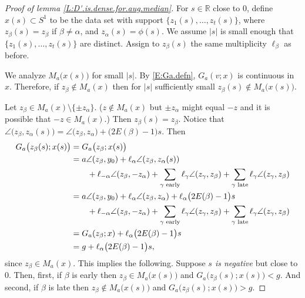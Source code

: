 \documentclass[10pt,a4paper]{amsart}
\newcommand{\RR}{\mathbb{R}}
\begin{document}
\begin{proof}[Proof of lemma \ref{L:D'.is.dense.for.aug.median}]
For $s \in \RR$ close to 0, define $x(s) \subset S^{1}$ to be the data set with support 
$\{ z_{1}(s), \ldots, z_{t}(s) \}$, where $z_{\beta}(s) = z_{\beta}$
if $\beta \neq \alpha$, and $z_{\alpha}(s) = \phi(s)$. We assume $|s|$ is small enough that 
$\{ z_{1}(s), \ldots, z_{t}(s) \}$ are distinct. Assign to $z_{\beta}(s)$ the same multiplicity 
$\ell_{\beta}$ as before. 

We analyze $M_{a} \bigl( x(s) \bigr)$ for small $|s|$. 
By \eqref{E:Ga.defn}, $G_{a}(v; x)$ is continuous in $x$. Therefore, 
if $z_{\beta} \notin M_{a}(x)$ then for $|s|$ sufficiently small 
$z_{\beta}(s) \notin M_{a} \bigl( x(s) \bigr)$. 

Let $z_{\beta} \in M_{a}(x) \setminus \{ \pm z_{\alpha} \}$. ($z \notin M_{a}(x)$ but $\pm z_{\alpha}$ might equal $-z$ and it is possible that $-z \in M_{a}(x)$.)
Then $z_{\beta}(s) = z_{\beta}$. Notice that 
$\angle \bigl(  z_{\beta} , z_{\alpha}(s) \bigr) = \angle \bigl(  z_{\beta} , z_{\alpha} \bigr) + \bigl( 2 E(\beta) - 1 \bigr) s$. Then
    \begin{align}   \label{E:Ga(z.beta(s),x(s)}
      G_{a} \bigl( z_{\beta}(s); x(s) \bigr) 
        &= G_{a} \bigl( z_{\beta}; x(s) \bigr) \notag \\
        &= a \angle(z_{\beta}, y_{0}) 
          + \ell_{\alpha} \angle( z_{\beta}, z_{\alpha}(s) )  \notag \\
        & \qquad + \ell_{-\alpha} \angle(z_{\beta}, -z_{\alpha}) 
          + \sum_{\gamma \text{ early}} 
            \ell_{\gamma} \angle( z_{\gamma}, z_{\beta} ) 
                + \sum_{\gamma \text{ late}} \ell_{\gamma} 
                  \angle( z_{\gamma}, z_{\beta} ) \notag \\
        &= a \angle(z_{\beta}, y_{0}) + \ell_{\alpha} \angle( z_{\beta}, z_{\alpha} )
           +  \ell_{\alpha} \bigl( 2 E(\beta) - 1 \bigr) s  \\
                   & \qquad + \ell_{-\alpha} \angle(z_{\beta}, -z_{\alpha}) 
          + \sum_{\gamma \text{ early}} 
            \ell_{\gamma} \angle( z_{\gamma}, z_{\beta} ) 
                + \sum_{\gamma \text{ late}} \ell_{\gamma} 
                  \angle( z_{\gamma}, z_{\beta} ) \notag \\
        &= G_{a}(z_{\beta}; x) + \ell_{\alpha} \bigl( 2 E(\beta) - 1 \bigr) s \notag \\
        &= g + \ell_{\alpha} \bigl( 2 E(\beta) - 1 \bigr) s , \notag
    \end{align}
since $z_{\beta} \in M_{a}(x)$. This implies the following. Suppose \emph{$s$ is negative} but close to 0. Then, first, if $\beta$ is early then 
$z_{\beta} \in M_{a} \bigl( x(s) \bigr)$ and 
$G_{a} \bigl( z_{\beta}(s); x(s) \bigr) < g$. And second, if $\beta$ is late then 
$z_{\beta} \notin M_{a} \bigl( x(s) \bigr)$ and 
$G_{a} \bigl( z_{\beta}(s); x(s) \bigr) > g$. 


\end{proof}
\end{document}
